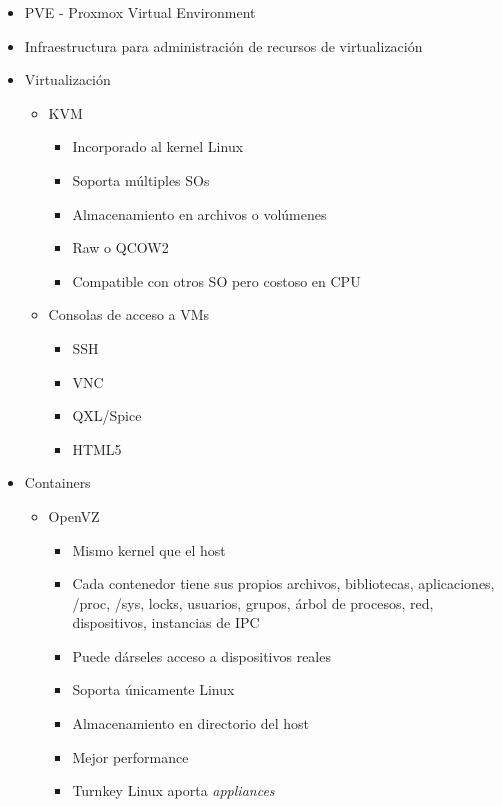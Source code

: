 \begin{itemize}
	\item PVE - Proxmox Virtual Environment
	\item Infraestructura para administración de recursos de virtualización
	\item Virtualización 
	\begin{itemize}
		\item KVM
		\begin{itemize}
			\item Incorporado al kernel Linux
			\item Soporta múltiples SOs
			\item Almacenamiento en archivos o volúmenes
			\item Raw o QCOW2
			\item Compatible con otros SO pero costoso en CPU  
		\end{itemize}		
		\item Consolas de acceso a VMs
		\begin{itemize}
			\item SSH
			\item VNC
			\item QXL/Spice
			\item HTML5
		\end{itemize}
	\end{itemize}	
	\item Containers
	\begin{itemize}
		\item 	OpenVZ
		\begin{itemize}
		\item Mismo kernel que el host
		\item Cada contenedor tiene sus propios archivos, bibliotecas, aplicaciones, /proc, /sys, locks, usuarios, grupos, árbol de procesos, red, dispositivos, instancias de IPC
		\item Puede dárseles acceso a dispositivos reales
		\item Soporta únicamente Linux
		\item Almacenamiento en directorio del host	
		\item Mejor performance
		\item Turnkey Linux aporta \textit{appliances}
		\end{itemize}
	\end{itemize}
\end{itemize}




